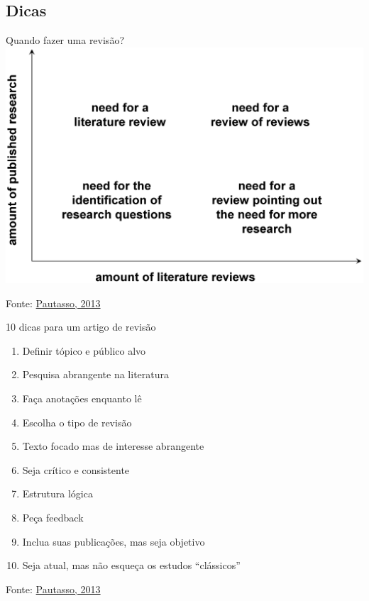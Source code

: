 \documentclass{beamer}
\begin{document}
\subsection{Dicas}

\begin{frame}{Quando fazer uma revisão?}
  \includegraphics[height=0.8\textheight]{Revisao_resumo/10_dicas_revisao}

  \vfill
  \scriptsize
  \hfill Fonte: \href{https://doi.org/10.1371/journal.pcbi.1003149}{Pautasso, 2013}
\end{frame}

\begin{frame}{10 dicas para um artigo de revisão}
  \begin{enumerate}
    \scriptsize
  \item<1> Definir tópico e público alvo
    \smallskip
  \item<2> Pesquisa abrangente na literatura
    \smallskip
  \item<3> Faça anotações enquanto lê
    \smallskip
  \item<4> Escolha o tipo de revisão
    \smallskip
  \item<5> Texto focado mas de interesse abrangente
    \smallskip
  \item<6> Seja crítico e consistente
    \smallskip
  \item<7> Estrutura lógica
    \smallskip
  \item<8> Peça feedback
    \smallskip
  \item<9> Inclua suas publicações, mas seja objetivo
    \smallskip
  \item<10> Seja atual, mas não esqueça os estudos ``clássicos''
  \end{enumerate}

  \vfill
  \scriptsize
  \hfill Fonte: \href{https://doi.org/10.1371/journal.pcbi.1003149}{Pautasso, 2013}
\end{frame}
\end{document}
